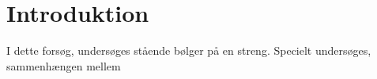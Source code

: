 \documentclass[A2_main.tex]{subfiles}
\begin{document}
\section{Introduktion}
I dette forsøg, undersøges stående bølger på en streng. Specielt undersøges, sammenhængen mellem 
\end{document}

